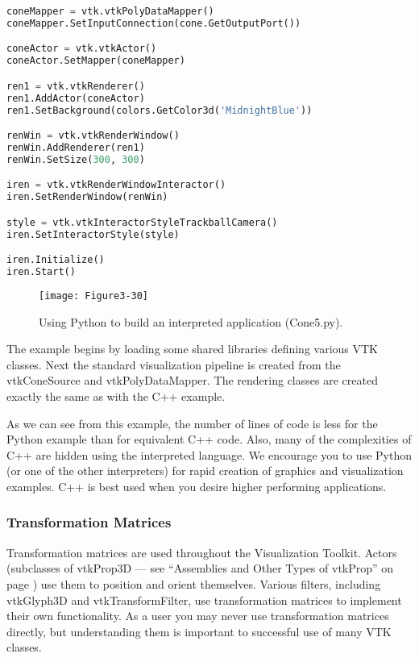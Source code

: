 \begin{description}[leftmargin=0cm,labelindent=0cm]
\begin{lstlisting}[language=Python, caption={Cone5.py}, escapechar=\$]
coneMapper = vtk.vtkPolyDataMapper()
coneMapper.SetInputConnection(cone.GetOutputPort())

coneActor = vtk.vtkActor()
coneActor.SetMapper(coneMapper)

ren1 = vtk.vtkRenderer()
ren1.AddActor(coneActor)
ren1.SetBackground(colors.GetColor3d('MidnightBlue'))

renWin = vtk.vtkRenderWindow()
renWin.AddRenderer(ren1)
renWin.SetSize(300, 300)

iren = vtk.vtkRenderWindowInteractor()
iren.SetRenderWindow(renWin)

style = vtk.vtkInteractorStyleTrackballCamera()
iren.SetInteractorStyle(style)

iren.Initialize()
iren.Start()
\end{lstlisting}

\begin{figure}[!htb]
  \centering
  \texttt{[image: Figure3-30]}\\
  \caption{Using Python to build an interpreted application (Cone5.py).}\label{fig:Figure3-30}
\end{figure}

The example begins by loading some shared libraries defining various VTK classes. Next the standard visualization pipeline is created from the vtkConeSource and vtkPolyDataMapper. The rendering classes are created exactly the same as with the C++ example.

As we can see from this example, the number of lines of code is less for the Python example than for equivalent C++ code. Also, many of the complexities of C++ are hidden using the interpreted language. We encourage you to use Python (or one of the other interpreters) for rapid creation of graphics and visualization examples. C++ is best used when you desire higher performing applications.

\end{description}

\subsubsection{Transformation Matrices}
\label{subsubsec:transform_matrices}

Transformation matrices are used throughout the  Visualization Toolkit. Actors (subclasses of vtkProp3D --- see ``Assemblies and Other Types of vtkProp'' on page \pageref{subsubsec:assemblies_vtkprop} ) use them to position and orient themselves. Various filters, including vtkGlyph3D and vtkTransformFilter, use transformation matrices to implement their own functionality. As a user you may never use transformation matrices directly, but understanding them is important to successful use of many VTK classes.

